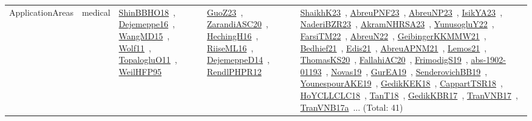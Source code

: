 {\begin{longtable}{lp{3cm}>{\raggedright\arraybackslash}p{6cm}>{\raggedright\arraybackslash}p{6cm}>{\raggedright\arraybackslash}p{8cm}}
ApplicationAreas & medical & \href{../works/ShinBBHO18.pdf}{ShinBBHO18}~\cite{ShinBBHO18}, \href{../works/Dejemeppe16.pdf}{Dejemeppe16}~\cite{Dejemeppe16}, \href{../works/WangMD15.pdf}{WangMD15}~\cite{WangMD15}, \href{../works/Wolf11.pdf}{Wolf11}~\cite{Wolf11}, \href{../works/TopalogluO11.pdf}{TopalogluO11}~\cite{TopalogluO11}, \href{../works/WeilHFP95.pdf}{WeilHFP95}~\cite{WeilHFP95} & \href{../works/GuoZ23.pdf}{GuoZ23}~\cite{GuoZ23}, \href{../works/ZarandiASC20.pdf}{ZarandiASC20}~\cite{ZarandiASC20}, \href{../works/HechingH16.pdf}{HechingH16}~\cite{HechingH16}, \href{../works/RiiseML16.pdf}{RiiseML16}~\cite{RiiseML16}, \href{../works/DejemeppeD14.pdf}{DejemeppeD14}~\cite{DejemeppeD14}, \href{../works/RendlPHPR12.pdf}{RendlPHPR12}~\cite{RendlPHPR12} & \href{../works/ShaikhK23.pdf}{ShaikhK23}~\cite{ShaikhK23}, \href{../works/AbreuPNF23.pdf}{AbreuPNF23}~\cite{AbreuPNF23}, \href{../works/AbreuNP23.pdf}{AbreuNP23}~\cite{AbreuNP23}, \href{../works/IsikYA23.pdf}{IsikYA23}~\cite{IsikYA23}, \href{../works/NaderiBZR23.pdf}{NaderiBZR23}~\cite{NaderiBZR23}, \href{../works/AkramNHRSA23.pdf}{AkramNHRSA23}~\cite{AkramNHRSA23}, \href{../works/YunusogluY22.pdf}{YunusogluY22}~\cite{YunusogluY22}, \href{../works/FarsiTM22.pdf}{FarsiTM22}~\cite{FarsiTM22}, \href{../works/AbreuN22.pdf}{AbreuN22}~\cite{AbreuN22}, \href{../works/GeibingerKKMMW21.pdf}{GeibingerKKMMW21}~\cite{GeibingerKKMMW21}, \href{../works/Bedhief21.pdf}{Bedhief21}~\cite{Bedhief21}, \href{../works/Edis21.pdf}{Edis21}~\cite{Edis21}, \href{../works/AbreuAPNM21.pdf}{AbreuAPNM21}~\cite{AbreuAPNM21}, \href{../works/Lemos21.pdf}{Lemos21}~\cite{Lemos21}, \href{../works/ThomasKS20.pdf}{ThomasKS20}~\cite{ThomasKS20}, \href{../works/FallahiAC20.pdf}{FallahiAC20}~\cite{FallahiAC20}, \href{../works/FrimodigS19.pdf}{FrimodigS19}~\cite{FrimodigS19}, \href{../works/abs-1902-01193.pdf}{abs-1902-01193}~\cite{abs-1902-01193}, \href{../works/Novas19.pdf}{Novas19}~\cite{Novas19}, \href{../works/GurEA19.pdf}{GurEA19}~\cite{GurEA19}, \href{../works/SenderovichBB19.pdf}{SenderovichBB19}~\cite{SenderovichBB19}, \href{../works/YounespourAKE19.pdf}{YounespourAKE19}~\cite{YounespourAKE19}, \href{../works/GedikKEK18.pdf}{GedikKEK18}~\cite{GedikKEK18}, \href{../works/CappartTSR18.pdf}{CappartTSR18}~\cite{CappartTSR18}, \href{../works/HoYCLLCLC18.pdf}{HoYCLLCLC18}~\cite{HoYCLLCLC18}, \href{../works/TanT18.pdf}{TanT18}~\cite{TanT18}, \href{../works/GedikKBR17.pdf}{GedikKBR17}~\cite{GedikKBR17}, \href{../works/TranVNB17.pdf}{TranVNB17}~\cite{TranVNB17}, \href{../works/TranVNB17a.pdf}{TranVNB17a}~\cite{TranVNB17a}... (Total: 41)\\

\end{longtable}}
